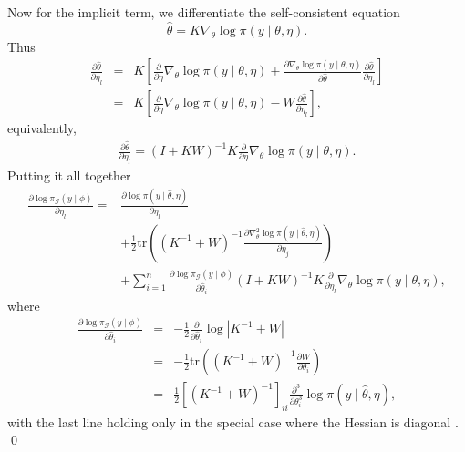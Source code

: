 \documentclass[stslayout, noinfoline]{imsart}
\theoremstyle{definition}
\begin{document}
Now for the implicit term, we differentiate the self-consistent equation
\begin{equation*}
  \hat \theta = K \nabla_\theta \log \pi(y \mid \theta, \eta).
\end{equation*}
%
Thus
\begin{eqnarray*}
  \frac{\partial \hat \theta}{\partial \eta_l} & = & K \left [ \frac{\partial}{\partial \eta} \nabla_\theta \log \pi(y \mid \theta, \eta) + \frac{\partial \nabla_\theta \log \pi(y \mid \theta, \eta)}{\partial \hat \theta} \frac{\partial \hat \theta}{\partial \eta_l} \right ] \\
  & = & K \left [ \frac{\partial}{\partial \eta} \nabla_\theta \log \pi(y \mid \theta, \eta) - W \frac{\partial \hat \theta}{\partial \eta_l} \right ],
\end{eqnarray*}
equivalently,
\begin{eqnarray*}
  \frac{\partial \hat \theta}{\partial \eta_l} = (I + KW)^{-1} K \frac{\partial}{\partial \eta} \nabla_\theta \log \pi(y \mid \theta, \eta).
\end{eqnarray*}
%
Putting it all together
\begin{equation*} \label{eq:gradient}
\begin{aligned}
  \frac{\partial \log \pi_\mathcal{G} (y \mid \phi)}{\partial \eta_l} =&  \frac{\partial \log \pi(y \mid \hat \theta, \eta)}{\partial \eta_l} \\
  & %
  + \frac{1}{2} \mathrm{tr} \left ((K^{-1} + W)^{-1} \frac{\partial \nabla^2_\theta \log \pi(y \mid \hat \theta, \eta)}{\partial \eta_j} \right) \\
 & + \sum_{i = 1}^n \frac{\partial \log \pi_\mathcal{G} (y \mid \phi)}{\partial \hat \theta_i} (I + KW)^{-1} K \frac{\partial}{\partial \eta_l} \nabla_\theta \log \pi(y \mid \theta, \eta),
\end{aligned}
\end{equation*}
%
where 
%
\begin{eqnarray*}
   \frac{\partial \log \pi_\mathcal{G}(y \mid \phi)}{\partial \hat \theta_i} & = & - \frac{1}{2} \frac{\partial}{\partial \hat \theta_i} \log |K^{-1} + W| \\
   & = & - \frac{1}{2} \mathrm{tr} \left ((K^{-1} + W)^{-1} \frac{\partial W}{\partial \theta_i} \right) \\
   & = & \frac{1}{2} \left [ (K^{-1} + W)^{-1} \right ]_{ii} \frac{\partial^3}{\partial \theta^3_i} \log \pi(y \mid \hat \theta, \eta),
\end{eqnarray*}
%
with the last line holding only in the special case where the Hessian is diagonal \citep[equation 5.23]{Rasmussen:2006}. \qed
\end{document}

